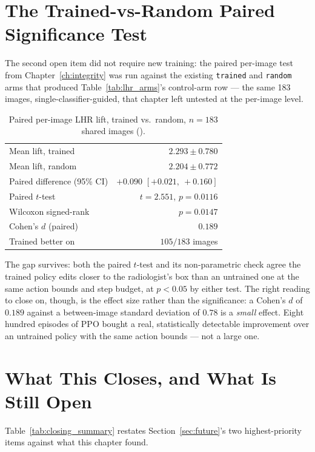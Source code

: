 \section{The Trained-vs-Random Paired Significance Test}
\label{sec:closing_significance}

The second open item did not require new training: the paired per-image
test from Chapter~\ref{ch:integrity} was run against the existing
\texttt{trained} and \texttt{random} arms that produced
Table~\ref{tab:lhr_arms}'s control-arm row --- the same 183 images,
single-classifier-guided, that chapter left untested at the per-image
level.

\begin{table}[h]
\centering
\caption[Paired trained-vs-random significance test]{Paired per-image LHR
lift, trained vs.\ random, $n=183$ shared images (\pton{}).}
\label{tab:closing_significance}
\begin{tabular}{@{}lr@{}}
\toprule
Mean lift, trained & $2.293 \pm 0.780$ \\
Mean lift, random  & $2.204 \pm 0.772$ \\
Paired difference (95\% CI) & $+0.090$ $[+0.021,\ +0.160]$ \\
Paired $t$-test & $t=2.551$, $p=0.0116$ \\
Wilcoxon signed-rank & $p=0.0147$ \\
Cohen's $d$ (paired) & $0.189$ \\
Trained better on & $105/183$ images \\
\bottomrule
\end{tabular}
\end{table}

The gap survives: both the paired $t$-test and its non-parametric check
agree the trained policy edits closer to the radiologist's box than an
untrained one at the same action bounds and step budget, at $p<0.05$ by
either test. The right reading to close on, though, is the effect size
rather than the significance: a Cohen's $d$ of $0.189$ against a
between-image standard deviation of $0.78$ is a \emph{small} effect. Eight
hundred episodes of PPO bought a real, statistically detectable
improvement over an untrained policy with the same action bounds --- not a
large one.

\section{What This Closes, and What Is Still Open}

Table~\ref{tab:closing_summary} restates Section~\ref{sec:future}'s two
highest-priority items against what this chapter found.

